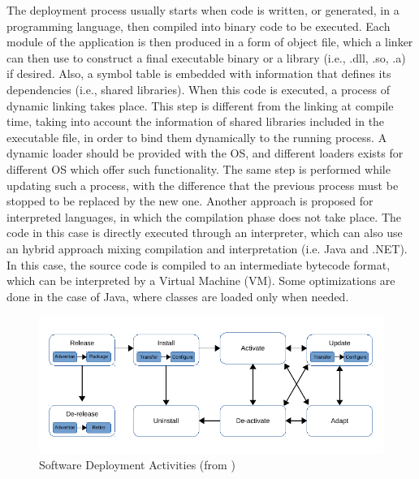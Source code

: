 The deployment process usually starts when code is written, or generated, in a programming language, then compiled into binary code to be executed.
Each module of the application is then produced in a form of object file, which a linker can then use to construct a final executable binary or a library (i.e., .dll, .so, .a) if desired.
Also, a symbol table is embedded with information that defines its dependencies (i.e., shared libraries).
When this code is executed, a process of dynamic linking takes place.
This step is different from the linking at compile time, taking into account the information of shared libraries included in the executable file, in order to bind them dynamically to the running process.
A dynamic loader should be provided with the OS, and different loaders exists for different OS which offer such functionality.
The same step is performed while updating such a process, with the difference that the previous process must be stopped to be replaced by the new one.
Another approach is proposed for interpreted languages, in which the compilation phase does not take place.
The code in this case is directly executed through an interpreter, which can also use an hybrid approach mixing compilation and interpretation (i.e. Java and .NET).
In this case, the source code is compiled to an intermediate bytecode format, which can be interpreted by a Virtual Machine (VM).
Some optimizations are done in the case of Java, where classes are loaded only when needed.

\begin{figure}[htb]
	\centering
	\includegraphics[width=1\columnwidth]{chapters/stateOfTheArt.images/DeploymentActivities.pdf}
	\caption{Software Deployment Activities (from \cite{gunalp2014continuous})}
	\label{fig:DeployActivities}
\end{figure}

